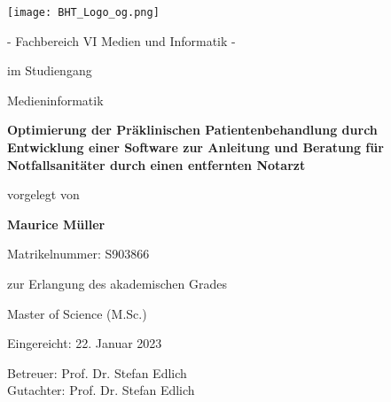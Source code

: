 
\begin{titlepage}
    \sffamily
    \centering
    \vspace*{-3.5cm} %
    \texttt{[image: BHT\_Logo\_og.png]}
   

    {- Fachbereich VI Medien und Informatik -\par \vspace{0.5cm}
    im Studiengang\par Medieninformatik\par}
    \vspace{1.25cm}
 

    {\Large \bfseries{Optimierung der Präklinischen Patientenbehandlung durch Entwicklung einer
    Software zur Anleitung und Beratung für Notfallsanitäter durch einen entfernten
    Notarzt}\par}
	\vspace{1.25cm}
	
    
    \normalsize vorgelegt von \par\vspace{1.25cm}

	{\large \bfseries Maurice Müller} \par\vspace{0.1cm}
	 Matrikelnummer: S903866 \par \vspace{1.25cm}

    {\large zur Erlangung des akademischen Grades\par
    Master of Science (M.Sc.)\par}


    \vspace{1.0cm}
    {\normalsize  Eingereicht:  22. Januar 2023\par}
   

   
    \vfill
    \begin{center}
      { \normalsize
        Betreuer:  \hspace{12mm} Prof. Dr. Stefan Edlich\\
        Gutachter:\hspace{12mm} Prof. Dr. Stefan Edlich\\
       }
    \end{center} 



\end{titlepage}